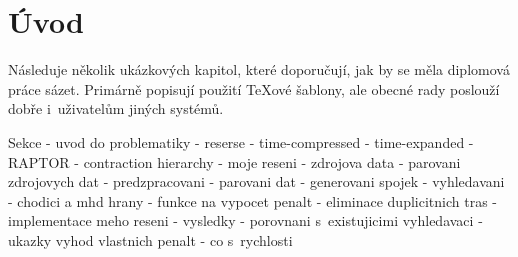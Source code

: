 \chapter*{Úvod}

Následuje několik ukázkových kapitol, které doporučují, jak by se
měla diplomová práce sázet. Primárně popisují použití \TeX{}ové
šablony, ale obecné rady poslouží dobře i~uživatelům jiných
systémů.

Sekce
- uvod do problematiky
- reserse
  - time-compressed
  - time-expanded
  - RAPTOR
  - contraction hierarchy
- moje reseni
  - zdrojova data
  - parovani zdrojovych dat
  - predzpracovani
    - parovani dat
    - generovani spojek
  - vyhledavani
    - chodici a mhd hrany
    - funkce na vypocet penalt
    - eliminace duplicitnich tras
- implementace meho reseni
- vysledky
  - porovnani s~existujicimi vyhledavaci
  - ukazky vyhod vlastnich penalt
  - co s~rychlosti

